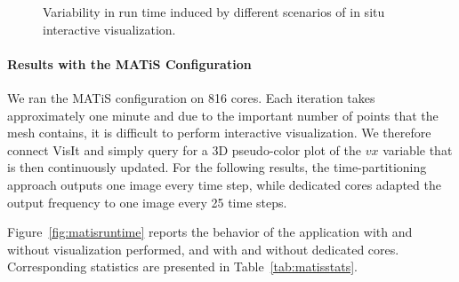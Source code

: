\begin{figure}[t]
\centering
	\quad
	\caption[Run-time variability in CM1 due to ISV]{Variability 
	in run time induced by different scenarios of in situ 
	interactive visualization.}\label{fig:nek5variability}
\end{figure}

\paragraph{Results with the MATiS Configuration}
We ran the MATiS configuration on 816 cores. Each 
iteration takes approximately one minute and due to the important number of points 
that the mesh contains, it is difficult to perform interactive visualization. 
We therefore connect VisIt and simply query for a 3D pseudo-color plot of the $vx$ 
variable that is then continuously updated.
For the following results, the time-partitioning approach outputs one image every time step,
while dedicated cores adapted the output frequency to one image every 25 
time steps.

Figure~\ref{fig:matisruntime} reports the behavior of the application with and 
without visualization performed, and with and without dedicated cores. 
Corresponding statistics are presented in Table~\ref{tab:matisstats}.

